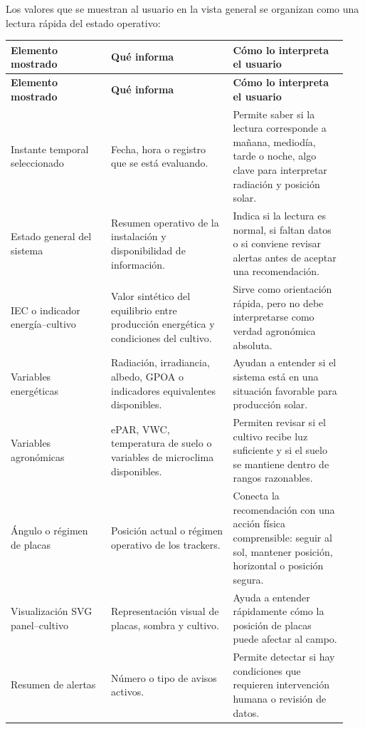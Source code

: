 ﻿\documentclass[11pt,a4paper]{article}
\begin{document}
Los valores que se muestran al usuario en la vista general se organizan como una lectura rápida del estado operativo:

\begin{longtable}{p{0.28\linewidth}p{0.34\linewidth}p{0.32\linewidth}}
\toprule
\textbf{Elemento mostrado} & \textbf{Qué informa} & \textbf{Cómo lo interpreta el usuario} \\
\midrule
\endfirsthead
\toprule
\textbf{Elemento mostrado} & \textbf{Qué informa} & \textbf{Cómo lo interpreta el usuario} \\
\midrule
\endhead
Instante temporal seleccionado & Fecha, hora o registro que se está evaluando. & Permite saber si la lectura corresponde a mañana, mediodía, tarde o noche, algo clave para interpretar radiación y posición solar. \\ \addlinespace
Estado general del sistema & Resumen operativo de la instalación y disponibilidad de información. & Indica si la lectura es normal, si faltan datos o si conviene revisar alertas antes de aceptar una recomendación. \\ \addlinespace
IEC o indicador energía--cultivo & Valor sintético del equilibrio entre producción energética y condiciones del cultivo. & Sirve como orientación rápida, pero no debe interpretarse como verdad agronómica absoluta. \\ \addlinespace
Variables energéticas & Radiación, irradiancia, albedo, GPOA o indicadores equivalentes disponibles. & Ayudan a entender si el sistema está en una situación favorable para producción solar. \\ \addlinespace
Variables agronómicas & ePAR, VWC, temperatura de suelo o variables de microclima disponibles. & Permiten revisar si el cultivo recibe luz suficiente y si el suelo se mantiene dentro de rangos razonables. \\ \addlinespace
Ángulo o régimen de placas & Posición actual o régimen operativo de los trackers. & Conecta la recomendación con una acción física comprensible: seguir al sol, mantener posición, horizontal o posición segura. \\ \addlinespace
Visualización SVG panel--cultivo & Representación visual de placas, sombra y cultivo. & Ayuda a entender rápidamente cómo la posición de placas puede afectar al campo. \\ \addlinespace
Resumen de alertas & Número o tipo de avisos activos. & Permite detectar si hay condiciones que requieren intervención humana o revisión de datos. \\
\bottomrule
\end{longtable}
\end{document}
